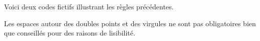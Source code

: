 \documentclass[10pt, a4paper]{article}
\begin{document}
\medskip


Voici deux codes fictifs illustrant les règles précédentes.
\begin{multicols}{2}

\end{multicols}




\begin{tdocnote}
    Les espaces autour des doubles points et des virgules ne sont pas obligatoires bien que conseillés pour des raisons de lisibilité.
\end{tdocnote}
\end{document}
